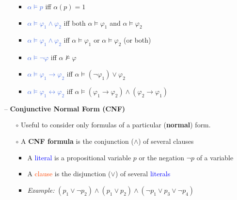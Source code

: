 \begin{itemize}
\begin{itemize}
\begin{minipage}{.45\textwidth}
\begin{itemize}
                \item \textcolor{RoyalBlue}{$\alpha \models p$} iff $\alpha(p) = 1$
                \item \textcolor{RoyalBlue}{$\alpha \models \varphi_1 \wedge \varphi_2$} iff both $\alpha \models \varphi_1$ and $\alpha \models \varphi_2$
                \item \textcolor{RoyalBlue}{$\alpha \models \varphi_1 \wedge \varphi_2$} iff $\alpha \models \varphi_1$ or $\alpha \models \varphi_2$ (or both)
            \end{itemize}
        \end{minipage}
        \begin{minipage}{.45\textwidth}
        \vspace{0.15cm}
            \begin{itemize}
                \item \textcolor{RoyalBlue}{$\alpha \models \neg \varphi$} iff $\alpha \not \models \varphi$
                \item \textcolor{RoyalBlue}{$\alpha \models \varphi_1 \rightarrow \varphi_2$} iff $\alpha \models (\neg \varphi_1) \vee \varphi_2$
                \item \textcolor{RoyalBlue}{$\alpha \models \varphi_1 \leftrightarrow \varphi_2$} iff $\alpha \models (\varphi_1 \rightarrow \varphi_2) \wedge (\varphi_2 \rightarrow \varphi_1)$
            \end{itemize}
        \end{minipage}
    \end{itemize}
    \newpage
    \item[--] \textbf{Conjunctive Normal Form (CNF)}
    \begin{itemize}
        \item[$\circ$] Useful to consider only formulas of a particular (\textbf{normal}) form.
        \item[$\circ$] A \textbf{CNF formula} is the conjunction ($\wedge$) of several clauses
        \begin{itemize}
            \item A \textcolor{blue}{literal} is a propositional variable $p$ or the negation $\neg p$ of a variable
            \item A \textcolor{OrangeRed}{clause} is the disjunction ($\vee$) of several \textcolor{blue}{literals}
            \item \textit{Example:} $(p_1 \vee \neg p_2) \wedge (p_1 \vee p_2) \wedge (\neg p_1 \vee p_3 \vee \neg p_4)$
            \\

\end{itemize}
\end{itemize}
\end{itemize}
